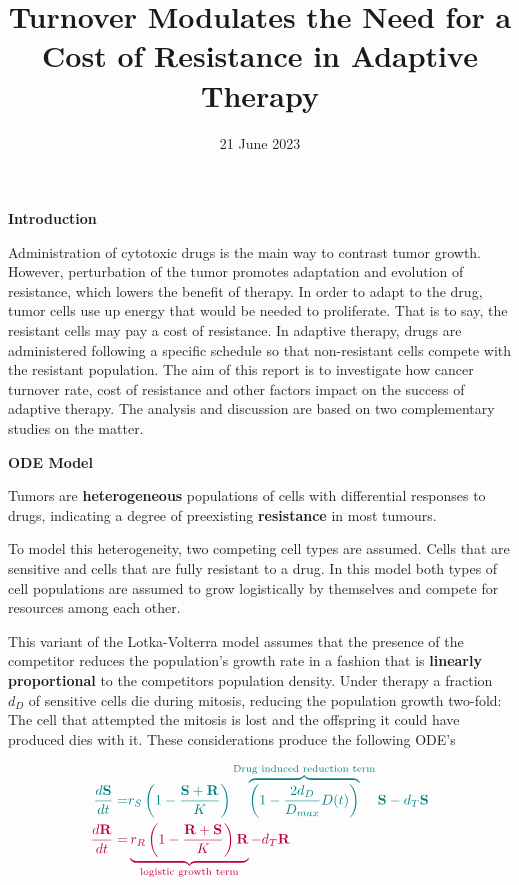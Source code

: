 \documentclass[11pt,a4paper]{article}
\title{\textbf{Turnover Modulates the Need for a Cost of Resistance in Adaptive Therapy}}
\date{21 June 2023}
\begin{document}
 \textbf{Introduction}

 \vspace{1mm}


Administration of  cytotoxic drugs is the main way to contrast tumor growth. However, perturbation of the tumor promotes adaptation and evolution of resistance, which lowers the benefit of therapy. In order to adapt to the drug, tumor cells use up energy that would be needed to proliferate. That is to say, the resistant cells may pay a cost of resistance. In adaptive therapy, drugs are administered following a specific schedule so that non-resistant cells compete with the resistant population.                                                                        
The aim of this report is to investigate how cancer turnover rate, cost of resistance and other factors impact on the success of adaptive therapy. The analysis and discussion are based on two complementary studies on the matter.

 \vspace{2mm}

 \textbf{ODE Model}

  \vspace{1mm}
Tumors are \textbf{heterogeneous} populations of cells with differential responses to drugs, indicating a degree of preexisting \textbf{resistance} in most tumours. 

To model this heterogeneity, two competing cell types are assumed. Cells that are sensitive and cells that are fully resistant to a drug.
In this model both types of cell populations are assumed to grow logistically by themselves and compete for resources among each other.

This variant of the Lotka-Volterra model assumes that the presence of the competitor reduces the population’s growth rate in a fashion that is \textbf{linearly proportional}
to the competitors population density. Under therapy a fraction $d_D$ of sensitive cells die during mitosis, reducing the population growth two-fold:
The cell that attempted the mitosis is lost and the offspring it could have produced dies with it.
These considerations produce the following ODE's
		
	\begin{align*}	
		\color{teal} \frac{d\textbf{S}}{dt} = & \color{teal}
			r_S \left(1-\frac{\textbf{S}+\textbf{R}}{K} \right)
			\overbrace{\left(1 - \frac{2d_D}{D_{max}} D(t)\right) }^\text{Drug induced reduction term} \textbf{S}
			- d_T \textbf{S} \\
		\color{purple} \frac{d\textbf{R}}{dt} = & \color{purple}
			\underbrace{ r_R \left(1-\frac{\textbf{R} + \textbf{S}}{K} \right) \textbf{R} }_\text{logistic growth term}
			 - d_T \textbf{R} 
	\end{align*}
\end{document}
